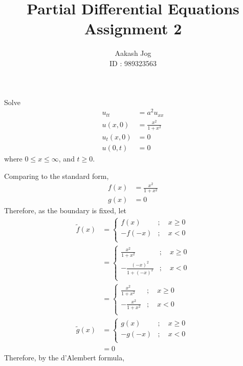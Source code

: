 \documentclass[fleqn, a4paper, 11pt, oneside]{amsart}
\title
[
	PDE : Assignent 2
]
{
	Partial Differential Equations\\
	Assignment 2
}
\author
{
	Aakash Jog\\
	ID : 989323563
}
\date{\formatdate{10}{3}{2016}}
\theoremstyle{definition}
\theoremstyle{theorem}
\renewcommand{\tilde}{\widetilde}
\begin{document}
\maketitle

\begin{question}
	Solve
	\begin{align*}
		u_{t t}  & = a^2 u_{x x}         \\
		u(x,0)   & = \frac{x^2}{1 + x^2} \\
		u_t(x,0) & = 0                   \\
		u(0,t)   & = 0
	\end{align*}
	where $0 \le x \le \infty$, and $t \ge 0$.
\end{question}

\begin{solution}
	Comparing to the standard form,
	\begin{align*}
		f(x) & = \frac{x^2}{1 + x^2} \\
		g(x) & = 0
	\end{align*}
	Therefore, as the boundary is fixed, let
	\begin{align*}
		\tilde{f}(x) &=
			\begin{cases}
				f(x)   & ;\quad x \ge 0 \\
				-f(-x) & ;\quad x < 0   \\
			\end{cases}\\
		&=
			\begin{cases}
				\frac{x^2}{1 + x^2}        & ;\quad x \ge 0 \\
				-\frac{(-x)^2}{1 + (-x)^2} & ;\quad x < 0   \\
			\end{cases}\\
		&=
			\begin{cases}
				\frac{x^2}{1 + x^2}  & ;\quad x \ge 0 \\
				-\frac{x^2}{1 + x^2} & ;\quad x < 0   \\
			\end{cases}\\
		\tilde{g}(x) &=
			\begin{cases}
				g(x)   & ;\quad x \ge 0 \\
				-g(-x) & ;\quad x < 0   \\
			\end{cases}\\
		&= 0
	\end{align*}
	Therefore, by the d'Alembert formula,
	\begin{align*}

\end{align*}
\end{solution}
\end{document}
